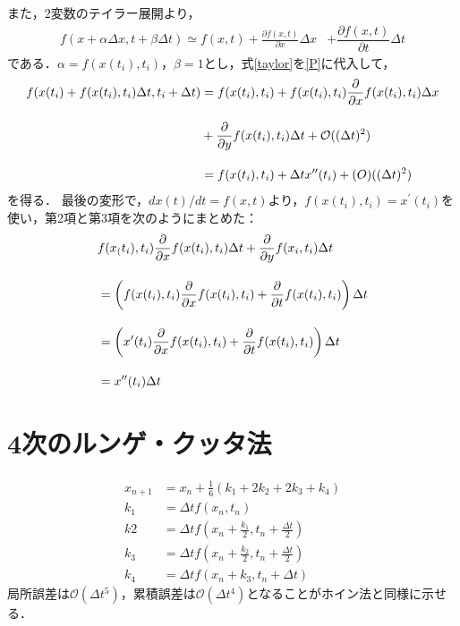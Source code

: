 \documentclass[12pt]{jsarticle}\usepackage{ifthen}\newboolean{enlarge}\setboolean{enlarge}{false}
\newcommand{\nn}{\notag \\}
\begin{document}
また，2変数のテイラー展開より，
\begin{align}\label{taylor}
f(x+\alpha\Delta x,t+\beta\Delta t)
%
\simeq f(x,t)+\frac{\partial f(x,t)}{\partial x}\Delta x&+\dfrac{\partial f(x,t)}{\partial t}\Delta t
\end{align}
である．$\alpha=f(x(t_i),t_i)$，$\beta=1$とし，式\eqref{taylor}を\eqref{P}に代入して，
\begin{align}
	f(x(t_i)+f(x(t_i),t_i)\Delta t, t_i+\Delta t)
	&=f(x(t_i),t_i)+f(x(t_i),t_i)\frac{\partial }{\partial x}f(x(t_i),t_i)\Delta x\nn[10pt]
	&+\dfrac{\partial}{\partial y} f(x(t_i),t_i)\Delta t
	+\mathcal{O}((\Delta t)^2)\nn[10pt]
	&=f(x(t_i),t_i)+\Delta tx^{\prime\prime}(t_i) + \mathcal(O)((\Delta t)^2)
\end{align}
を得る．
最後の変形で，$dx(t)/dt=f(x,t)$より，$f(x(t_i),t_i)=x^{\prime}(t_i)$を使い，第2項と第3項を次のようにまとめた：
\begin{align}
	&f(x_(t_i),t_i)\frac{\partial }{\partial x}f(x(t_i),t_i)\Delta t
	+\dfrac{\partial}{\partial y} f(x_i,t_i)\Delta t\nn[10pt]
	&=\left(f(x(t_i),t_i)\frac{\partial }{\partial x}f(x(t_i),t_i)
	+\dfrac{\partial}{\partial t} f(x(t_i),t_i)
	\right)\Delta t\nn[10pt]
	&=
	\left(x^{\prime}(t_i)\frac{\partial }{\partial x}f(x(t_i),t_i)
	+\dfrac{\partial}{\partial t} f(x(t_i),t_i)
	\right)\Delta t\nn[10pt]
	&=x^{\prime\prime}(t_i)\Delta t
\end{align}

\section{4次のルンゲ・クッタ法}
\begin{align}
	x_{n+1}&=x_n+\frac{1}{6}(k_1+2k_2+2k_3+k_4)\\[10pt]
	k_1&=\Delta t f(x_n,t_n)\\[10pt]
	k2 &=\Delta t f\left(x_n+\frac{k_1}{2},t_n+\frac{\Delta t}{2}\right)\\[10pt]
	k_3 &=\Delta t f\left(x_n+\frac{k_2}{2},t_n+\frac{\Delta t}{2}\right)\\[10pt]
	k_4&=\Delta tf(x_n+k_3,t_n+\Delta t)
\end{align}
局所誤差は$\mathcal O(\Delta t^5)$，累積誤差は$\mathcal O(\Delta t^4)$となることがホイン法と同様に示せる．
\end{document}
